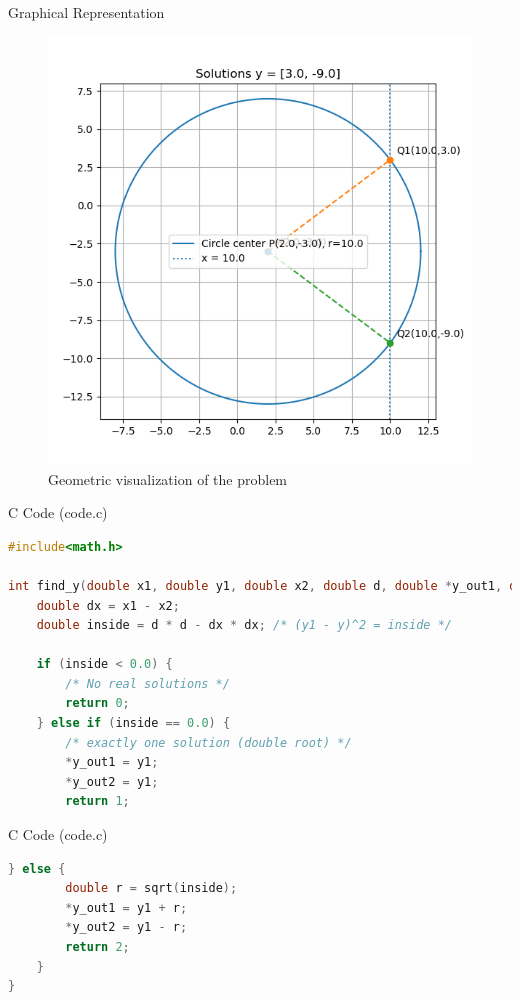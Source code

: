 \documentclass{beamer}
\begin{document}
\begin{frame}{Graphical Representation}
\begin{figure}
\centering
\includegraphics[width=0.7\linewidth]{figs/fig.png}
\caption{Geometric visualization of the problem}
\end{figure}
\end{frame}

\begin{frame}[fragile]{C Code (code.c)}
\begin{lstlisting}[language=C]
#include<math.h>

int find_y(double x1, double y1, double x2, double d, double *y_out1, double *y_out2) {
    double dx = x1 - x2;
    double inside = d * d - dx * dx; /* (y1 - y)^2 = inside */

    if (inside < 0.0) {
        /* No real solutions */
        return 0;
    } else if (inside == 0.0) {
        /* exactly one solution (double root) */
        *y_out1 = y1;
        *y_out2 = y1;
        return 1;
\end{lstlisting}
\end{frame}
\begin{frame}[fragile]{C Code (code.c)}
\begin{lstlisting}[language=C]
    } else {
        double r = sqrt(inside);
        *y_out1 = y1 + r;
        *y_out2 = y1 - r;
        return 2;
    }
}
\end{lstlisting}
\end{frame}
\end{document}
